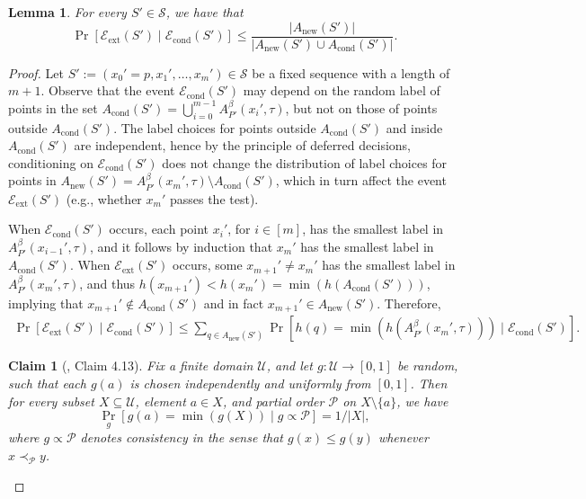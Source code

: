 \documentclass[11pt,letterpaper]{article}
\theoremstyle{plain}
\newtheorem{lemma}[theorem]{Lemma}
\newtheorem{claim}[theorem]{Claim}
\theoremstyle{definition}
\theoremstyle{remark}
\newcommand{\Econd}{\ensuremath{\mathcal{E}_{\mathrm{cond}}}\xspace}
\newcommand{\Eextend}{\ensuremath{\mathcal{E}_{\mathrm{ext}}}\xspace}
\newcommand{\Acond}{\ensuremath{A_{\mathrm{cond}}}\xspace}
\newcommand{\Anew}{\ensuremath{A_{\mathrm{new}}}\xspace}
\begin{document}
        \begin{lemma}
            \label{lemma:ext_cond}
            For every $S'\in \mathcal{S}$, we have that 
            \begin{equation*}
                \label{eqn:formalized}
                \Pr[\Eextend(S')\mid \Econd(S')]\leq \frac{|\Anew(S')|}{|\Anew(S')\cup \Acond(S')|} .
            \end{equation*} 
        \end{lemma}
        \begin{proof} 
            Let $S' := (x_{0}'=p, x_{1}', \ldots, x_{m}')\in \mathcal{S}$ be a fixed sequence with a length of $m+1$.  
            Observe that the event $\Econd(S')$ may depend on the random label of points in the set $\Acond(S') = \bigcup_{i=0}^{m-1} A_{P'}^{\beta}(x_{i}', \tau)$, but not on those of points outside $\Acond(S')$. 
            The label choices for points outside $\Acond(S')$ and inside $\Acond(S')$ are independent, hence by the principle of deferred decisions, conditioning on $\Econd(S')$ does not change the distribution of label choices for points in $\Anew(S')=A_{P'}^{\beta}(x_{m}', \tau)\setminus \Acond(S')$, which in turn affect the event $\Eextend(S')$ (e.g., whether $x_{m}'$ passes the test). 
            
            When $\Econd(S')$ occurs, each point $x_{i}'$, for $i\in[m]$, has the smallest label in $A_{P'}^{\beta}(x_{i-1}', \tau)$,
            and it follows by induction that $x_{m}'$ has the smallest label in $\Acond(S')$. 
            When $\Eextend(S')$ occurs, some $x_{m+1}'\neq x_{m}'$ has the smallest label in $A_{P'}^{\beta}(x_{m}', \tau)$, and thus $h(x_{m+1}')< h(x_{m}') = \min(h(\Acond(S')))$, implying that $x_{m+1}'\notin \Acond(S')$ and in fact $x_{m+1}'\in \Anew(S')$. 
            Therefore, 
        \begin{eqnarray}
            \label{eqn:condition_probability}
            \Pr[\Eextend(S') \mid \Econd(S')] \leq \sum_{q\in \Anew(S')} \Pr[h(q) = \min(h(A_{P'}^{\beta}(x_{m}', \tau)))\mid \Econd(S')].
        \end{eqnarray} 
    
        \begin{claim}[\cite{CGJKV24}, Claim 4.13]
            \label{claim:partial_order}
            Fix a finite domain $\mathcal{U}$, and let $g: \mathcal{U}\to [0, 1]$ be random, such that each $g(a)$ is chosen independently and uniformly from $[0, 1]$. 
            Then for every subset $X\subseteq \mathcal{U}$, element $a\in X$, and partial order $\mathcal{P}$ on $X\setminus\{a\}$, we have 
            \begin{equation*}
                \Pr_{g} [g(a) = \min(g(X)) \mid g\propto \mathcal{P}] = 1/|X|, 
            \end{equation*}
            where $g\propto \mathcal{P}$ denotes consistency in the sense that $g(x)\leq g(y)$ whenever $x\prec_{\mathcal{P}} y$. 
        \end{claim} 


\end{proof}
\end{document}
